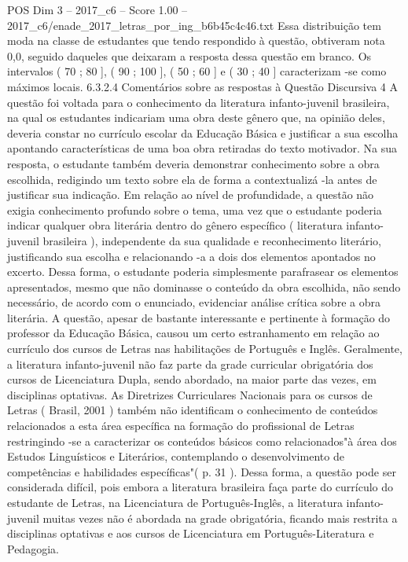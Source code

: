 \begin{textsample}{POS Dim 3 – 2017\_c6 – Score 1.00 – 2017\_c6/enade\_2017\_letras\_por\_ing\_b6b45c4c46.txt}
Essa distribuição tem moda na classe de estudantes que tendo respondido à questão, obtiveram nota 0,0, seguido daqueles que deixaram a resposta dessa questão em branco.
Os intervalos ( 70 ; 80 ], ( 90 ; 100 ], ( 50 ; 60 ] e ( 30 ; 40 ] caracterizam -se como máximos locais. 6.3.2.4 Comentários sobre as respostas à Questão Discursiva 4 A questão foi voltada para o conhecimento da literatura infanto-juvenil brasileira, na qual os estudantes indicariam uma obra deste gênero que, na opinião deles, deveria constar no currículo escolar da Educação Básica e justificar a sua escolha apontando características de uma boa obra retiradas do texto motivador.
Na sua resposta, o estudante também deveria demonstrar conhecimento sobre a obra escolhida, redigindo um texto sobre ela de forma a contextualizá -la antes de justificar sua indicação.
Em relação ao nível de profundidade, a questão não exigia conhecimento profundo sobre o tema, uma vez que o estudante poderia indicar qualquer obra literária dentro do gênero específico ( literatura infanto-juvenil brasileira ), independente da sua qualidade e reconhecimento literário, justificando sua escolha e relacionando -a a dois dos elementos apontados no excerto.
Dessa forma, o estudante poderia simplesmente parafrasear os elementos apresentados, mesmo que não dominasse o conteúdo da obra escolhida, não sendo necessário, de acordo com o enunciado, evidenciar análise crítica sobre a obra literária.
A questão, apesar de bastante interessante e pertinente à formação do professor da Educação Básica, causou um certo estranhamento em relação ao currículo dos cursos de Letras nas habilitações de Português e Inglês.
Geralmente, a literatura infanto-juvenil não faz parte da grade curricular obrigatória dos cursos de Licenciatura Dupla, sendo abordado, na maior parte das vezes, em disciplinas optativas.
As Diretrizes Curriculares Nacionais para os cursos de Letras ( Brasil, 2001 ) também não identificam o conhecimento de conteúdos relacionados a esta área específica na formação do profissional de Letras restringindo -se a caracterizar os conteúdos básicos como relacionados"à área dos Estudos Linguísticos e Literários, contemplando o desenvolvimento de competências e habilidades específicas"( p. 31 ).
Dessa forma, a questão pode ser considerada difícil, pois embora a literatura brasileira faça parte do currículo do estudante de Letras, na Licenciatura de Português-Inglês, a literatura infanto-juvenil muitas vezes não é abordada na grade obrigatória, ficando mais restrita a disciplinas optativas e aos cursos de Licenciatura em Português-Literatura e Pedagogia.

\end{textsample}
